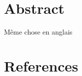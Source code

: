 \documentclass[12pt,twoside]{reedthesis}
\theoremstyle{definition}
\theoremstyle{definition}
\theoremstyle{remark}
\begin{document}
  \newpage
  
  \chapter*{Abstract}\label{abstract}
  
  \newpage
  
  Même chose en anglais
  
  \chapter*{References}\label{references}


\end{document}
